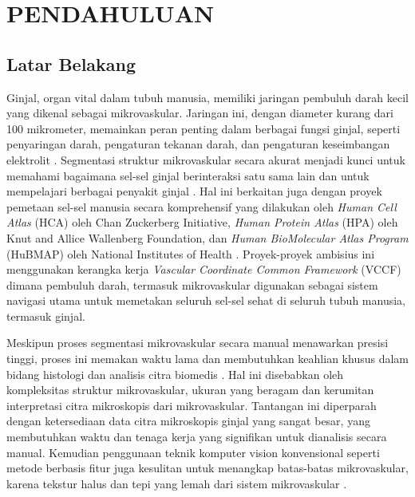 \chapter{PENDAHULUAN}
\section{Latar Belakang}
\label{section:latarbelakang}
\noindent Ginjal, organ vital dalam tubuh manusia, memiliki jaringan pembuluh darah kecil yang dikenal sebagai mikrovaskular. Jaringan ini, dengan diameter kurang dari 100 mikrometer, memainkan peran penting dalam berbagai fungsi ginjal, seperti penyaringan darah, pengaturan tekanan darah, dan pengaturan keseimbangan elektrolit \cite{hu_multi-scale_2023}. Segmentasi struktur mikrovaskular secara akurat menjadi kunci untuk memahami bagaimana sel-sel ginjal berinteraksi satu sama lain dan untuk mempelajari berbagai penyakit ginjal \cite{zhang_attention-based_2023}. Hal ini berkaitan juga dengan proyek pemetaan sel-sel manusia secara komprehensif yang dilakukan oleh \textit{Human Cell Atlas} (HCA) oleh Chan Zuckerberg Initiative, \textit{Human Protein Atlas} (HPA) oleh Knut and Allice Wallenberg Foundation, dan \textit{Human BioMolecular Atlas Program} (HuBMAP) oleh National Institutes of Health \cite{weber_considerations_2020}. Proyek-proyek ambisius ini menggunakan kerangka kerja \textit{Vascular Coordinate Common Framework} (VCCF) dimana pembuluh darah, termasuk mikrovaskular digunakan sebagai sistem navigasi utama untuk memetakan seluruh sel-sel sehat di seluruh tubuh manusia, termasuk ginjal. 

\noindent Meskipun proses segmentasi mikrovaskular secara manual menawarkan presisi tinggi, proses ini memakan waktu lama dan membutuhkan keahlian khusus dalam bidang histologi dan analisis citra biomedis \cite{hu_multi-scale_2023,weber_considerations_2020}. Hal ini disebabkan oleh kompleksitas struktur mikrovaskular, ukuran yang beragam dan kerumitan interpretasi citra mikroskopis dari mikrovaskular. Tantangan ini diperparah dengan ketersediaan data citra mikroskopis ginjal yang sangat besar, yang membutuhkan waktu dan tenaga kerja yang signifikan untuk dianalisis secara manual. Kemudian penggunaan teknik komputer vision konvensional seperti metode berbasis fitur juga kesulitan untuk menangkap batas-batas mikrovaskular, karena tekstur halus dan tepi yang lemah dari sistem mikrovaskular \cite{zhang_attention-based_2023}.



